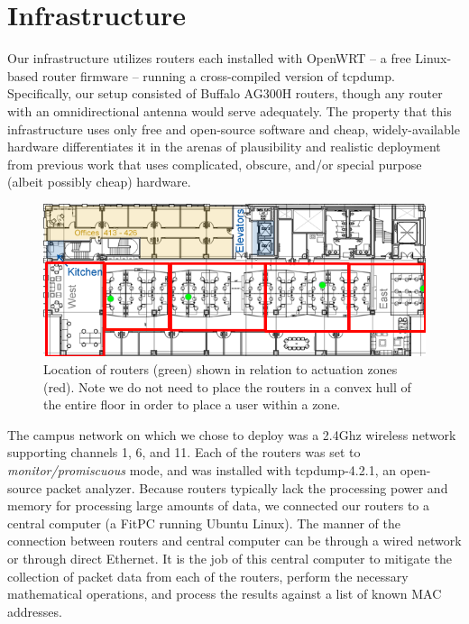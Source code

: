 \section{Infrastructure}
Our infrastructure utilizes routers each installed with OpenWRT -- a free Linux-based router firmware -- running a cross-compiled version of tcpdump.  Specifically, our setup consisted of Buffalo AG300H routers, though any router with an omnidirectional antenna would serve adequately. The property that this infrastructure uses only free and open-source software and cheap, widely-available hardware differentiates it in the arenas of plausibility and realistic deployment from previous work that uses complicated, obscure, and/or special purpose (albeit possibly cheap) hardware. 

\begin{figure}[htb]
\begin{center}
\includegraphics[width=\linewidth]{figs/floor4}
\end{center}
\caption{Location of routers (green) shown in relation to actuation zones (red). Note we do not need to place the routers in a convex hull of the entire floor in order to place a user within a zone.}
\end{figure}

The campus network on which we chose to deploy was a 2.4Ghz wireless network supporting channels 1, 6, and 11. Each of the routers was set to \emph{monitor/promiscuous} mode, and was installed with tcpdump-4.2.1, an open-source packet analyzer. Because routers typically lack the processing power and memory for processing large amounts of data, we connected our routers to a central computer (a FitPC running Ubuntu Linux). The manner of the connection between routers and central computer can be through a wired network or through direct Ethernet. It is the job of this central computer to mitigate the collection of packet data from each of the routers, perform the necessary mathematical operations, and process the results against a list of known MAC addresses. 

